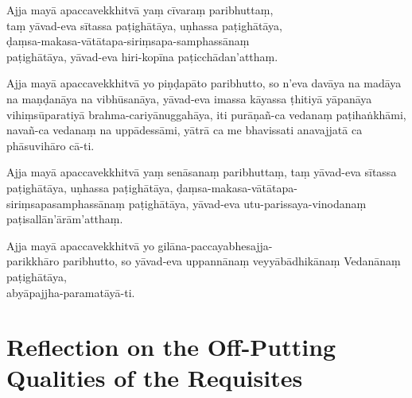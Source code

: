 
Ajja mayā apaccavekkhitvā yaṃ cīvaraṃ paribhuttaṃ,\\
taṃ yāvad-eva sītassa paṭighātāya, uṇhassa paṭighātāya,\\
ḍaṃsa-makasa-vātātapa-siriṃsapa-samphassānaṃ\\
paṭighātāya, yāvad-eva hiri-kopīna paṭicchādan'atthaṃ.

Ajja mayā apaccavekkhitvā yo piṇḍapāto paribhutto, so n'eva davāya na madāya na
maṇḍanāya na vibhūsanāya, yāvad-eva imassa kāyassa ṭhitiyā yāpanāya
vihiṃsūparatiyā brahma-cariyānuggahāya, iti purāṇañ-ca vedanaṃ paṭihaṅkhāmi,
navañ-ca vedanaṃ na uppādessāmi, yātrā ca me bhavissati anavajjatā ca
phāsuvihāro cā-ti.

Ajja mayā apaccavekkhitvā yaṃ senāsanaṃ paribhuttaṃ, taṃ yāvad-eva sītassa
paṭighātāya, uṇhassa paṭighātāya, ḍaṃsa-makasa-vātātapa-siriṃsapasamphassānaṃ
paṭighātāya, yāvad-eva utu-parissaya-vinodanaṃ paṭisallān'ārām'atthaṃ.

Ajja mayā apaccavekkhitvā yo gilāna-paccayabhesajja-\\ parikkhāro paribhutto, so
yāvad-eva uppannānaṃ veyyābādhikānaṃ Vedanānaṃ paṭighātāya,\\
abyāpajjha-paramatāyā-ti. 

\section{Reflection on the Off-Putting Qualities of the Requisites}

\begin{leader}
\end{leader}


